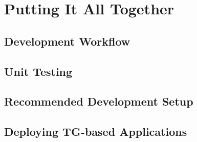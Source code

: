 \chapter{Putting It All Together}\label{ch01:08}

\section{Development Workflow}

\section{Unit Testing}

\section{Recommended Development Setup}

\section{Deploying TG-based Applications}